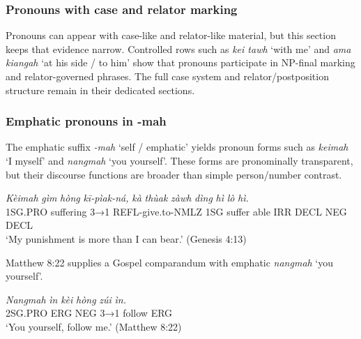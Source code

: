 \documentclass[
  11pt,
  a4paper,
]{article}
\newcommand{\tdim}[1]{\textit{#1}}
\newcommand{\tdimword}[1]{\textit{#1}}
\renewcommand{\textsc}[1]{{\footnotesize\MakeUppercase{#1}}}
\newcommand{\glossquote}[1]{`#1'}
\begin{document}
\subsubsection{Pronouns with case and relator
marking}\label{pronouns-with-case-and-relator-marking}

Pronouns can appear with case-like and relator-like material, but this
section keeps that evidence narrow. Controlled rows such as
\tdim{kei tawh} \glossquote{with me} and \tdim{ama kiangah}
\glossquote{at his side / to him} show that pronouns participate in
NP-final marking and relator-governed phrases. The full case system and
relator/postposition structure remain in their dedicated sections.

\subsubsection{Emphatic pronouns in
-mah}\label{emphatic-pronouns-in--mah}

The emphatic suffix \tdim{-mah} \glossquote{self / emphatic} yields
pronoun forms such as \tdim{keimah} \glossquote{I myself} and
\tdim{nangmah} \glossquote{you yourself}. These forms are pronominally
transparent, but their discourse functions are broader than simple
person/number contrast.

\begin{exe}
\ex \label{ex:emph-keimah}
\gll \tdimword{Kèimah} \tdimword{gìm} \tdimword{hòng} \tdimword{kī-pìak-ná,} \tdimword{kà} \tdimword{thùak} \tdimword{zàwh} \tdimword{dìng} \tdimword{hì} \tdimword{lò} \tdimword{hì.} \\
     \textsc{1sg}.\textsc{pro} suffering \textsc{3→1} \textsc{refl}-give.to-\textsc{nmlz} \textsc{1sg} suffer able \textsc{irr} \textsc{decl} \textsc{neg} \textsc{decl} \\
\glt \glossquote{My punishment is more than I can bear.} (Genesis 4:13)
\end{exe}

Matthew 8:22 supplies a Gospel comparandum with emphatic \tdim{nangmah}
\glossquote{you yourself}.

\begin{exe}
\ex \label{ex:emph-nangmah}
\gll \tdimword{Nangmah} \tdimword{ìn} \tdimword{kèi} \tdimword{hòng} \tdimword{zúi} \tdimword{ìn.} \\
     \textsc{2sg}.\textsc{pro} \textsc{erg} \textsc{neg} \textsc{3→1} follow \textsc{erg} \\
\glt \glossquote{You yourself, follow me.} (Matthew 8:22)
\end{exe}
\end{document}
